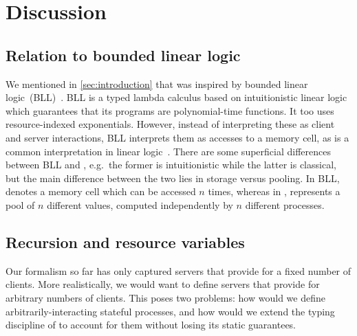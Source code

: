 \chapter{Discussion}\label{sec:discussion}


\section{Relation to bounded linear logic}
We mentioned in \cref{sec:introduction} that \nodcap was inspired by
bounded linear logic~(BLL)~\cite{girard1992}. BLL is a typed lambda calculus
based on intuitionistic linear logic which guarantees that its programs are
polynomial-time functions.
It too uses resource-indexed exponentials. However, instead of interpreting
these as client and server interactions, BLL interprets them as accesses to a
memory cell, as is a common interpretation in linear logic~\cite{girard1987}.
There are some superficial differences between BLL and \nodcap, e.g.\ the former
is intuitionistic while the latter is classical, but the main difference between
the two lies in storage versus pooling. In BLL,  denotes a memory
cell which can be accessed $n$ times, whereas in \nodcap, 
represents a pool of $n$ different values, computed independently by $n$
different processes.

\section{Recursion and resource variables}
Our formalism so far has only captured servers that provide for a fixed number
of clients.  More realistically, we would want to define servers that provide
for arbitrary numbers of clients.  This poses two problems: how would we define
arbitrarily-interacting stateful processes, and how would we extend the
typing discipline of \nodcap to account for them without losing its static
guarantees.

